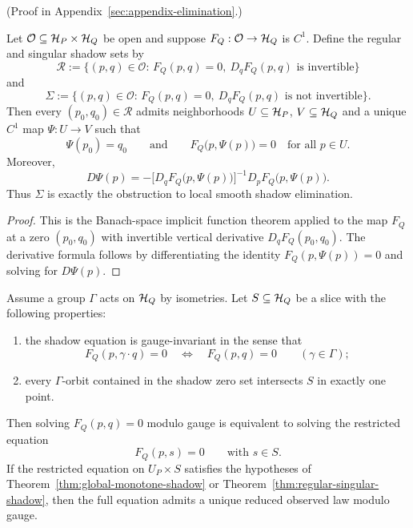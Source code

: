 (Proof in Appendix~\ref{sec:appendix-elimination}.)

\begin{theorem}
\label{thm:regular-singular-shadow}
Let $\mathcal O\subseteq \mathcal{H}_P\times\mathcal{H}_Q$ be open and suppose
$F_Q:\mathcal O\to\mathcal{H}_Q$ is $C^1$. Define the regular and singular shadow sets
by
\[
\mathcal R
:=
\{(p,q)\in\mathcal O:\,F_Q(p,q)=0,\ D_qF_Q(p,q)\text{ is invertible}\}
\]
and
\[
\Sigma
:=
\{(p,q)\in\mathcal O:\,F_Q(p,q)=0,\ D_qF_Q(p,q)\text{ is not invertible}\}.
\]
Then every $(p_0,q_0)\in\mathcal R$ admits neighborhoods
$U\subseteq \mathcal{H}_P$, $V\subseteq \mathcal{H}_Q$ and a unique $C^1$ map
$\Psi:U\to V$ such that
\[
\Psi(p_0)=q_0
\qquad\text{and}\qquad
F_Q\bigl(p,\Psi(p)\bigr)=0
\quad \text{for all }p\in U.
\]
Moreover,
\[
D\Psi(p)
=
-\bigl[D_qF_Q\bigl(p,\Psi(p)\bigr)\bigr]^{-1}
  D_pF_Q\bigl(p,\Psi(p)\bigr).
\]
Thus $\Sigma$ is exactly the obstruction to local smooth shadow elimination.
\end{theorem}

\begin{proof}
This is the Banach-space implicit function theorem applied to the map
$F_Q$ at a zero $(p_0,q_0)$ with invertible vertical derivative
$D_qF_Q(p_0,q_0)$. The derivative formula follows by differentiating the
identity $F_Q(p,\Psi(p))=0$ and solving for $D\Psi(p)$.
\end{proof}

\begin{proposition}
\label{prop:gauge-sliced-shadow}
Assume a group $\Gamma$ acts on $\mathcal{H}_Q$ by isometries. Let
$S\subseteq \mathcal{H}_Q$ be a slice with the following properties:
\begin{enumerate}[label=(\roman*), leftmargin=2em, itemsep=0.2em]
\item the shadow equation is gauge-invariant in the sense that
      \[
      F_Q(p,\gamma\cdot q)=0
      \quad\Longleftrightarrow\quad
      F_Q(p,q)=0
      \qquad
      (\gamma\in\Gamma);
      \]
\item every $\Gamma$-orbit contained in the shadow zero set intersects $S$ in
      exactly one point.
\end{enumerate}
Then solving $F_Q(p,q)=0$ modulo gauge is equivalent to solving the restricted
equation
\[
F_Q(p,s)=0
\qquad\text{with } s\in S.
\]
If the restricted equation on $U_P\times S$ satisfies the hypotheses of
Theorem~\ref{thm:global-monotone-shadow} or
Theorem~\ref{thm:regular-singular-shadow}, then the full equation admits a
unique reduced observed law modulo gauge.
\end{proposition}

